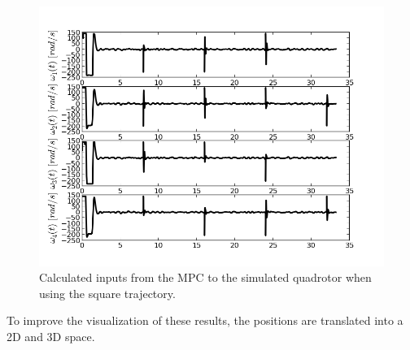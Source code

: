\begin{figure}[H]    
\centering
\includegraphics[scale=0.7]{Images/Chapter5/ardrone/T2/inputs.png}
\caption{Calculated inputs from the MPC to the simulated quadrotor when using the square trajectory. }
\label{fig:ardrone_sq_inp}
\end{figure}

To improve the visualization of these results, the positions are translated into a 2D and 3D space. 

